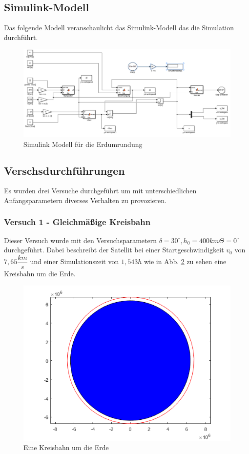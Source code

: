 \documentclass[]{scrartcl}
\begin{document}
\subsection{Simulink-Modell}

Das folgende Modell veranschaulicht das Simulink-Modell das die Simulation durchführt.

\begin{figure}[H]
\centering
\includegraphics[width=1\linewidth]{./Weltraum_1}
\caption{Simulink Modell für die Erdumrundung}
\label{fig:1_BezeichnerDiagramm}
\end{figure}

\subsection{Verschsdurchführungen}
Es wurden drei Versuche durchgeführt um mit unterschiedlichen Anfangsparametern diverses Verhalten zu provozieren.

\subsubsection{Versuch 1 - Gleichmäßige Kreisbahn}

Dieser Versuch wurde mit den Versuchsparametern $\delta = 30^\circ, h_0 = 400km \Theta = 0^\circ $ durchgeführt. Dabei beschreibt der Satellit bei einer Startgeschwindigkeit $v_0$ von $7,65 \dfrac{km}{s}$ und einer Simulationszeit von $1,543h$  wie in Abb. \ref{fig:1_Kreisbahn} zu sehen eine Kreisbahn um die Erde.

\begin{figure}[H]
\centering
\includegraphics[width=1\linewidth]{./1_kreisbahn}
\caption{Eine Kreisbahn um die Erde}
\label{fig:1_Kreisbahn}
\end{figure}
\end{document}
